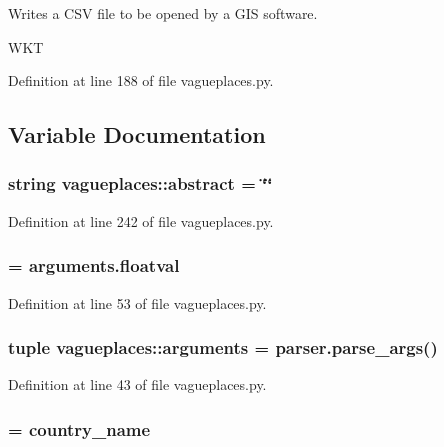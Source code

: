 \-Writes a \-C\-S\-V file to be opened by a \-G\-I\-S software. 

\-W\-K\-T 

\-Definition at line 188 of file vagueplaces.\-py.



\subsection{\-Variable \-Documentation}
\hypertarget{namespacevagueplaces_af80846e508540f2e094cdcfd30da1eeb}{
\subsubsection[{abstract}]{\setlength{\rightskip}{0pt plus 5cm}string {\bf vagueplaces\-::abstract} = \char`\"{}\char`\"{}}}\label{namespacevagueplaces_af80846e508540f2e094cdcfd30da1eeb}


\-Definition at line 242 of file vagueplaces.\-py.

\hypertarget{namespacevagueplaces_a968c6f69551718c27a9617d123ac04b0}{
\subsubsection[{alpha}]{ = arguments.\-floatval}}\label{namespacevagueplaces_a968c6f69551718c27a9617d123ac04b0}


\-Definition at line 53 of file vagueplaces.\-py.

\hypertarget{namespacevagueplaces_a3f96b3b895dcb14f99c0348f7c35f90a}{
\subsubsection[{arguments}]{\setlength{\rightskip}{0pt plus 5cm}tuple {\bf vagueplaces\-::arguments} = parser.\-parse\-\_\-args()}}\label{namespacevagueplaces_a3f96b3b895dcb14f99c0348f7c35f90a}


\-Definition at line 43 of file vagueplaces.\-py.

\hypertarget{namespacevagueplaces_a0bc0e84c0011cb9531184b67d05dc0a4}{
\subsubsection[{country}]{ = {\bf country\-\_\-name}}}\label{namespacevagueplaces_a0bc0e84c0011cb9531184b67d05dc0a4}


